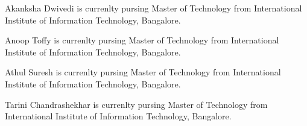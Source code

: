 \documentclass[journal]{IEEEtran}
\begin{document}
\begin{IEEEbiography}{Akanksha Dwivedi}
is currenlty pursing Master of Technology from International Institute of Information Technology, Bangalore. 
\end{IEEEbiography}

\begin{IEEEbiography}{Anoop Toffy}
is currenlty pursing Master of Technology from International Institute of Information Technology, Bangalore. 
\end{IEEEbiography}


\begin{IEEEbiography}{Athul Suresh}
is currenlty pursing Master of Technology from International Institute of Information Technology, Bangalore. 
\end{IEEEbiography}

\begin{IEEEbiography}{Tarini Chandrashekhar}
is currenlty pursing Master of Technology from International Institute of Information Technology, Bangalore. 

\end{IEEEbiography}
\end{document}
